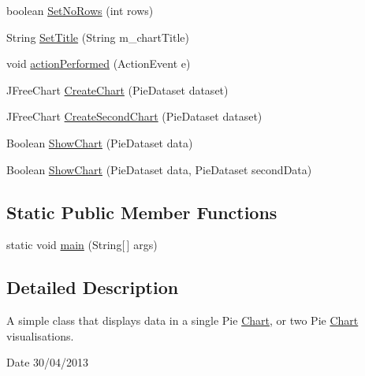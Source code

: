 \begin{DoxyCompactItemize}
\item 
boolean \hyperlink{class_pie_chart_ae80bc11611782f66bd3ad990baee963c}{Set\-No\-Rows} (int rows)
\item 
String \hyperlink{class_pie_chart_a2f762d12501691aa33335f33f1931f24}{Set\-Title} (String m\-\_\-chart\-Title)
\item 
void \hyperlink{class_pie_chart_ae30b814928c5a4bedb0cb86b48e18554}{action\-Performed} (Action\-Event e)
\item 
J\-Free\-Chart \hyperlink{class_pie_chart_abd00d9a07161c3fbf10bd6f19ec2750d}{Create\-Chart} (Pie\-Dataset dataset)
\item 
J\-Free\-Chart \hyperlink{class_pie_chart_afc121f4cb3d27f073711e844b7c26377}{Create\-Second\-Chart} (Pie\-Dataset dataset)
\item 
Boolean \hyperlink{class_pie_chart_aa9e53463d5ff3f5326fb92b25c89f349}{Show\-Chart} (Pie\-Dataset data)
\item 
Boolean \hyperlink{class_pie_chart_a38434bdbcc72eb384482dd372908e0ae}{Show\-Chart} (Pie\-Dataset data, Pie\-Dataset second\-Data)
\end{DoxyCompactItemize}
\subsection*{Static Public Member Functions}
\begin{DoxyCompactItemize}
\item 
static void \hyperlink{class_pie_chart_ab7e3bd074d520005660abe66a4ff00ff}{main} (String\mbox{[}$\,$\mbox{]} args)
\end{DoxyCompactItemize}


\subsection{Detailed Description}
A simple class that displays data in a single Pie \hyperlink{interface_chart}{Chart}, or two Pie \hyperlink{interface_chart}{Chart} visualisations. 

\begin{DoxyDate}{Date}
30/04/2013 
\end{DoxyDate}


